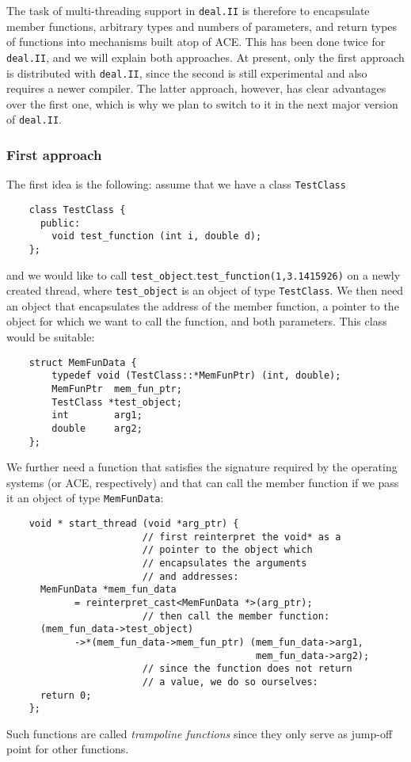 \documentclass[11pt]{article}
\begin{document}
The task of multi-threading support in \texttt{deal.II} is therefore to
encapsulate member functions, arbitrary types and numbers of parameters, and
return types of functions into mechanisms built atop of ACE. This has been
done twice for \texttt{deal.II}, and we will explain both approaches. At
present, only the first approach is distributed with \texttt{deal.II}, since
the second is still experimental and also requires a newer compiler. The
latter approach, however, has clear advantages over the first one, which is
why we plan to switch to it in the next major version of \texttt{deal.II}.


\subsubsection{First approach}

The first idea is the following: assume that we have a class
\texttt{TestClass}
\begin{verbatim}
    class TestClass {
      public:
        void test_function (int i, double d);
    };
\end{verbatim}
and we would like to call
\texttt{test\_object}.\texttt{test\_function(1,3.1415926)} on a newly created
thread, where \texttt{test\_object} is 
an object of type \texttt{TestClass}. We then need an object that encapsulates
the address of the member function, a pointer to the object for which we want
to call the function, and both parameters. This class would be suitable:
\begin{verbatim}
    struct MemFunData {
        typedef void (TestClass::*MemFunPtr) (int, double);
        MemFunPtr  mem_fun_ptr;
        TestClass *test_object;
        int        arg1;
        double     arg2;
    };
\end{verbatim}

We further need a function that satisfies the signature required by the
operating systems (or ACE, respectively) and that can call the member function
if we pass it an object of type \texttt{MemFunData}:
\begin{verbatim}
    void * start_thread (void *arg_ptr) {
                        // first reinterpret the void* as a
                        // pointer to the object which
                        // encapsulates the arguments
                        // and addresses:
      MemFunData *mem_fun_data
            = reinterpret_cast<MemFunData *>(arg_ptr);
                        // then call the member function:
      (mem_fun_data->test_object)
            ->*(mem_fun_data->mem_fun_ptr) (mem_fun_data->arg1,
                                            mem_fun_data->arg2);
                        // since the function does not return
                        // a value, we do so ourselves:
      return 0;
    };
\end{verbatim}
Such functions are called \textit{trampoline functions} since they only serve
as jump-off point for other functions.
\end{document}
